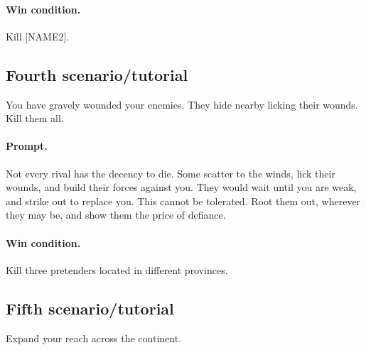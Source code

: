 \documentclass[12pt,letterpaper]{article}
\begin{document}
\paragraph{Win condition.}
Kill [NAME2].


\subsection{Fourth scenario/tutorial}

You have gravely wounded your enemies.
They hide nearby licking their wounds.
Kill them all.

\paragraph{Prompt.}
Not every rival has the decency to die.
Some scatter to the winds,
lick their wounds,
and build their forces against you.
They would wait until you are weak,
and strike out to replace you.
This cannot be tolerated.
Root them out, wherever they may be,
and show them the price of defiance.

%

\paragraph{Win condition.}
Kill three pretenders located in different provinces.


\subsection{Fifth scenario/tutorial}
Expand your reach across the continent.
\end{document}
